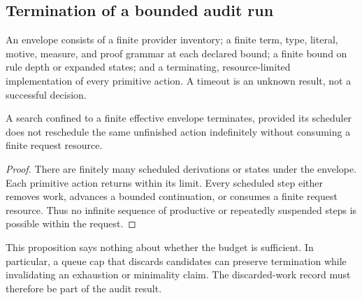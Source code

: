 \subsection{Termination of a bounded audit run}
\begin{definition}
An envelope consists of a finite provider inventory; a finite term, type, literal, motive, measure, and proof grammar at each declared bound; a finite bound on rule depth or expanded states; and a terminating, resource-limited implementation of every primitive action. A timeout is an unknown result, not a successful decision.
\end{definition}
\begin{proposition}
A search confined to a finite effective envelope terminates, provided its scheduler does not reschedule the same unfinished action indefinitely without consuming a finite request resource.
\end{proposition}
\begin{proof}
There are finitely many scheduled derivations or states under the envelope. Each primitive action returns within its limit. Every scheduled step either removes work, advances a bounded continuation, or consumes a finite request resource. Thus no infinite sequence of productive or repeatedly suspended steps is possible within the request.
\end{proof}
This proposition says nothing about whether the budget is sufficient. In particular, a queue cap that discards candidates can preserve termination while invalidating an exhaustion or minimality claim. The discarded-work record must therefore be part of the audit result.

